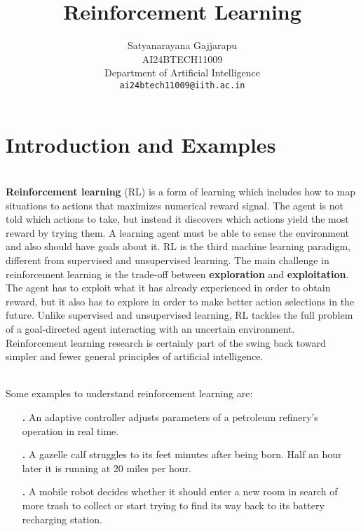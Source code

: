 \documentclass{article}
\title{Reinforcement Learning}
\author{%
Satyanarayana Gajjarapu \\
AI24BTECH11009 \\
Department of Artificial Intelligence \\
\texttt{ai24btech11009@iith.ac.in} \\
}
\begin{document}
\maketitle
\section{Introduction and Examples}
\begin{paragraph}
\\
\textbf{Reinforcement learning} (RL) is a form of learning which includes how to map situations to actions that maximizes numerical reward signal. The agent is not told which actions to take, but instead it discovers which actions yield the most reward by trying them. A learning agent must be able to sense the environment and also should have goals about it. RL is the third machine learning paradigm, different from supervised and unsupervised learning. The main challenge in reinforcement learning is the trade-off between \textbf{exploration} and \textbf{exploitation}. The agent has to exploit what it has already experienced in order to obtain reward, but it also has to explore in order to make better action selections in the future. Unlike supervised and unsupervised learning, RL tackles the full problem of a goal-directed agent interacting with an uncertain environment. Reinforcement learning research is certainly part of the swing back toward simpler and
fewer general principles of artificial intelligence.
\end{paragraph}
\begin{paragraph}
\\
Some examples to understand reinforcement learning are:
\begin{enumerate}
    \item[\textbf{.}]An adaptive controller adjusts parameters of a petroleum refinery’s operation in real time.
    \item[\textbf{.}]A gazelle calf struggles to its feet minutes after being born. Half an hour later it is running at 20 miles per hour.
    \item[\textbf{.}]A mobile robot decides whether it should enter a new room in search of more trash to collect or start trying to find its way back to its battery recharging station.
\end{enumerate}
\end{paragraph}
\end{document}
